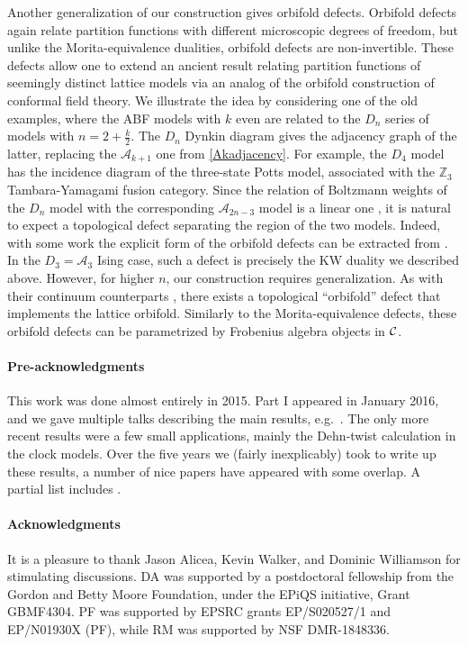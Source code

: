 Another generalization of our construction gives orbifold defects. 
Orbifold defects again relate partition functions with different microscopic degrees of freedom, 
but unlike the Morita-equivalence dualities, orbifold defects are non-invertible.
These defects allow one to extend an ancient result \cite{Fendley1989} relating partition functions of seemingly distinct lattice models via an analog of the orbifold construction of conformal field theory. 
We illustrate the idea by considering one of the old examples, where the ABF models with $k$ even are related to the $D_n$ series of models  \cite{Pasquier1986} with $n=2+\tfrac{k}{2}$.
The $D_n$ Dynkin diagram gives the adjacency graph of the latter, replacing the $\mathcal{A}_{k+1}$ one from \eqref{Akadjacency}. For example, the $D_4$ model has the incidence diagram of the three-state Potts model, associated with the $\mathbb{Z}_3$ Tambara-Yamagami fusion category.
Since the relation of Boltzmann weights of the $D_n$ model with the corresponding $\mathcal{A}_{2n-3}$ model is a linear one \cite{Fendley1989}, it is natural to expect a topological defect separating the region of the two models.
Indeed, with some work the explicit form of the orbifold defects can be extracted from \cite{Fendley1989}.
In the $D_3=\mathcal{A}_3$ Ising case, such a defect is precisely the KW duality we described above. 
However, for higher $n$, our construction requires generalization. 
As with their continuum counterparts \cite{Frohlich2009}, there exists a topological ``orbifold'' defect that implements the lattice orbifold. 
Similarly to the Morita-equivalence defects, these orbifold defects can be parametrized by Frobenius algebra objects in $\mathcal{C}$.


\paragraph{Pre-acknowledgments} This work was done almost entirely in 2015. Part I appeared in January 2016, and we gave multiple talks describing the main results, e.g.\ \cite{Aasen2017,Fendley2018}. The only more recent results were a few small applications, mainly the Dehn-twist calculation in the clock models.  Over the five years we (fairly inexplicably) took to write up these results, a number of nice papers have appeared with some overlap. A partial list includes
\cite{Buican2017,freed2018,Vanhove2018,Belletete2018,thorngren2019,Wenjie2019,Chang_2019,lootens2019,Belletete2020}.

\paragraph{Acknowledgments} It is a pleasure to thank Jason Alicea, Kevin Walker, and Dominic Williamson for stimulating discussions.
DA was supported by a postdoctoral fellowship from the Gordon
and Betty Moore Foundation, under the EPiQS initiative, Grant GBMF4304.
PF was supported by EPSRC grants EP/S020527/1 and EP/N01930X (PF), while 
RM was supported by NSF DMR-1848336.

